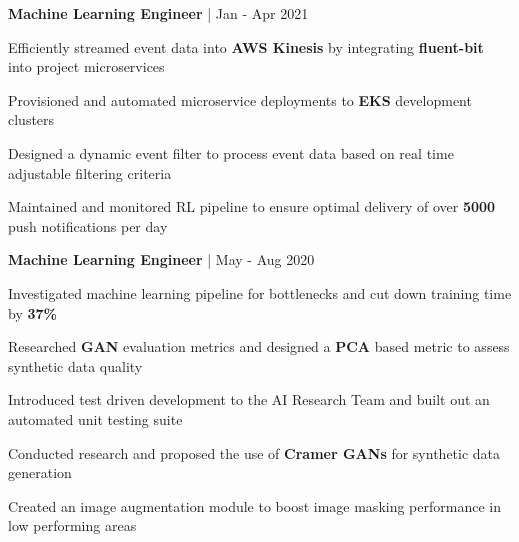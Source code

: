 


\begin{cventries}


\cventry
{\textbf{Machine Learning Engineer} | \color{awesome}{Zynga}}
{Jan - Apr 2021} %
{ %
\begin{cvitems}
\item {Efficiently streamed event data into \textbf{AWS Kinesis} by integrating \textbf{fluent-bit} into project microservices}
\item {Provisioned and automated microservice deployments to \textbf{EKS} development clusters}
\item {Designed a dynamic event filter to process event data based on real time adjustable filtering criteria}
\item {Maintained and monitored RL pipeline to ensure optimal delivery of over \textbf{5000} push notifications per day}
\end{cvitems}
}


\cventry
{\textbf{Machine Learning Engineer} | \color{awesome}{PerkinElmer}}
{May - Aug 2020} %
{ %
\begin{cvitems}
\item {Investigated machine learning pipeline for bottlenecks and cut down training time by \textbf{37\%}}
\item {Researched \textbf{GAN} evaluation metrics and designed a \textbf{PCA} based metric to assess synthetic data quality}
\item {Introduced test driven development to the AI Research Team and built out an automated unit testing suite}
\item {Conducted research and proposed the use of \textbf{Cramer GANs} for synthetic data generation}
\item {Created an image augmentation module to boost image masking performance in low performing areas}
\end{cvitems}
}


\end{cventries}
